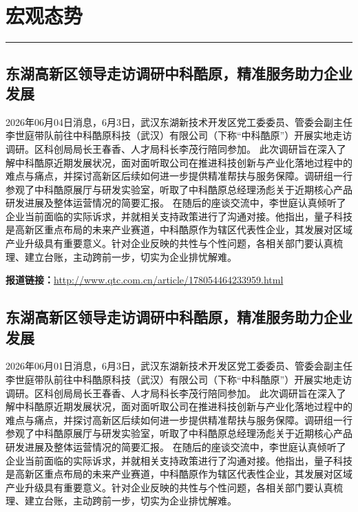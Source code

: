 \documentclass[12pt,a4paper]{ctexart}
\begin{document}
\newpage
\section{宏观态势}
\vspace{-0.5em}
\noindent\rule{\linewidth}{1.5pt}

\subsection{ 东湖高新区领导走访调研中科酷原，精准服务助力企业发展 }

2026年06月04日消息，6月3日，武汉东湖新技术开发区党工委委员、管委会副主任李世庭带队前往中科酷原科技（武汉）有限公司（下称“中科酷原”）开展实地走访调研。区科创局局长王春香、人才局科长李茂行陪同参加。
此次调研旨在深入了解中科酷原近期发展状况，面对面听取公司在推进科技创新与产业化落地过程中的难点与痛点，并探讨高新区后续如何进一步提供精准帮扶与服务保障。调研组一行参观了中科酷原展厅与研发实验室，听取了中科酷原总经理汤彪关于近期核心产品研发进展及整体运营情况的简要汇报。
在随后的座谈交流中，李世庭认真倾听了企业当前面临的实际诉求，并就相关支持政策进行了沟通对接。他指出，量子科技是高新区重点布局的未来产业赛道，中科酷原作为辖区代表性企业，其发展对区域产业升级具有重要意义。针对企业反映的共性与个性问题，各相关部门要认真梳理、建立台账，主动跨前一步，切实为企业排忧解难。

\noindent\textbf{报道链接：}\url{http://www.qtc.com.cn/article/178054464233959.html}

\subsection{ 东湖高新区领导走访调研中科酷原，精准服务助力企业发展 }

2026年06月01日消息，6月3日，武汉东湖新技术开发区党工委委员、管委会副主任李世庭带队前往中科酷原科技（武汉）有限公司（下称“中科酷原”）开展实地走访调研。区科创局局长王春香、人才局科长李茂行陪同参加。
此次调研旨在深入了解中科酷原近期发展状况，面对面听取公司在推进科技创新与产业化落地过程中的难点与痛点，并探讨高新区后续如何进一步提供精准帮扶与服务保障。调研组一行参观了中科酷原展厅与研发实验室，听取了中科酷原总经理汤彪关于近期核心产品研发进展及整体运营情况的简要汇报。
在随后的座谈交流中，李世庭认真倾听了企业当前面临的实际诉求，并就相关支持政策进行了沟通对接。他指出，量子科技是高新区重点布局的未来产业赛道，中科酷原作为辖区代表性企业，其发展对区域产业升级具有重要意义。针对企业反映的共性与个性问题，各相关部门要认真梳理、建立台账，主动跨前一步，切实为企业排忧解难。
\end{document}
